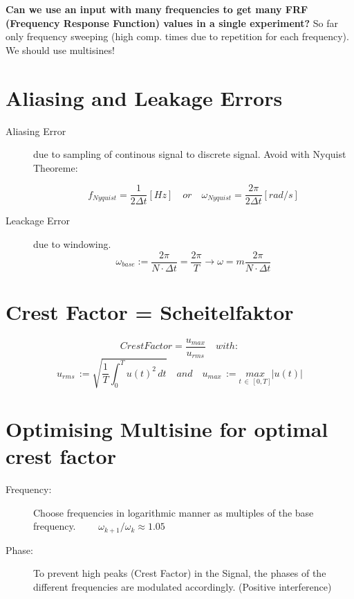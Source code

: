 \textbf{Can we use an input with many frequencies to get many FRF (Frequency Response Function) values in a single experiment?} So far only frequency sweeping (high comp. times due to repetition for each frequency). We should use multisines!

\section*{Aliasing and Leakage Errors}
\begin{description}
\item[Aliasing Error] due to sampling of continous signal to discrete signal. Avoid with Nyquist Theoreme:

\begin{equation*}
f_{Nyquist} = \frac{1}{2\Delta t} [Hz] \quad or \quad \omega_{Nyquist} = \frac{2 \pi }{ 2\Delta t} [rad/s]
\end{equation*}

\item[Leackage Error] due to windowing.
\begin{equation*}
\omega _{ base }:=\frac { 2\pi  }{ N\cdot \Delta t } =\frac { 2\pi  }{ T }  \rightarrow \omega = m\frac { 2\pi  }{ N\cdot \Delta t }
\end{equation*}
\end{description}


\section*{Crest Factor = Scheitelfaktor}
\begin{equation*}
CrestFactor=\frac { u_{ max } }{ u_{ rms } } \quad with:
\end{equation*}
\begin{equation*}
u_{ rms }\, := \sqrt{ \frac { 1 }{ T } \int _{ 0 }^{ T }{ u(t)^2 \, dt }  } \quad and \quad u_{ max }\, :=\underset { t\, \in \, [0,T] }{ max } |u(t)|
\end{equation*}

\section*{Optimising Multisine for optimal crest factor}
\begin{description}
\item[Frequency:] Choose frequencies in logarithmic manner as multiples of the base frequency. $\qquad \omega_{k+1}/\omega_{k} \approx 1.05$
\item[Phase:] To prevent high peaks (Crest Factor) in the Signal, the phases of the different frequencies are modulated accordingly. (Positive interference)
\end{description}



